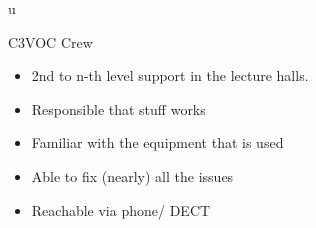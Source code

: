 u%

\begin{frame}{C3VOC Crew}
	\begin{itemize}
		\item 2nd to n-th level support in the lecture halls.
		\item Responsible that stuff works
		\item Familiar with the equipment that is used
		\item Able to fix (nearly) all the issues
		\item Reachable via phone/ DECT
	\end{itemize}
\end{frame}
